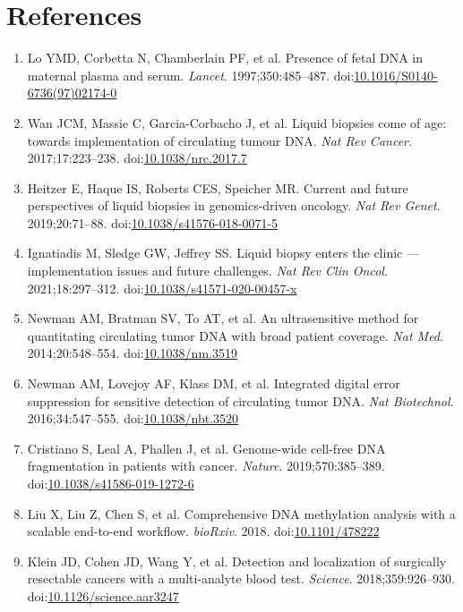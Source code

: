\documentclass[11pt]{article}
\begin{document}
\section{References}
\begin{enumerate}
\item
Lo YMD, Corbetta N, Chamberlain PF, et al. Presence of fetal DNA in maternal plasma and serum. \textit{Lancet}. 1997;350:485--487. doi:\href{https://doi.org/10.1016/S0140-6736(97)02174-0}{10.1016/\allowbreak{}S0140-6736(97)02174-0}
\item
Wan JCM, Massie C, Garcia-Corbacho J, et al. Liquid biopsies come of age: towards implementation of circulating tumour DNA. \textit{Nat Rev Cancer}. 2017;17:223--238. doi:\href{https://doi.org/10.1038/nrc.2017.7}{10.1038/\allowbreak{}nrc.2017.7}
\item
Heitzer E, Haque IS, Roberts CES, Speicher MR. Current and future perspectives of liquid biopsies in genomics-driven oncology. \textit{Nat Rev Genet}. 2019;20:71--88. doi:\href{https://doi.org/10.1038/s41576-018-0071-5}{10.1038/\allowbreak{}s41576-018-0071-5}
\item
Ignatiadis M, Sledge GW, Jeffrey SS. Liquid biopsy enters the clinic --- implementation issues and future challenges. \textit{Nat Rev Clin Oncol}. 2021;18:297--312. doi:\href{https://doi.org/10.1038/s41571-020-00457-x}{10.1038/\allowbreak{}s41571-020-00457-x}
\item
Newman AM, Bratman SV, To AT, et al. An ultrasensitive method for quantitating circulating tumor DNA with broad patient coverage. \textit{Nat Med}. 2014;20:548--554. doi:\href{https://doi.org/10.1038/nm.3519}{10.1038/\allowbreak{}nm.3519}
\item
Newman AM, Lovejoy AF, Klass DM, et al. Integrated digital error suppression for sensitive detection of circulating tumor DNA. \textit{Nat Biotechnol}. 2016;34:547--555. doi:\href{https://doi.org/10.1038/nbt.3520}{10.1038/\allowbreak{}nbt.3520}
\item
Cristiano S, Leal A, Phallen J, et al. Genome-wide cell-free DNA fragmentation in patients with cancer. \textit{Nature}. 2019;570:385--389. doi:\href{https://doi.org/10.1038/s41586-019-1272-6}{10.1038/\allowbreak{}s41586-019-1272-6}
\item
Liu X, Liu Z, Chen S, et al. Comprehensive DNA methylation analysis with a scalable end-to-end workflow. \textit{bioRxiv}. 2018. doi:\href{https://doi.org/10.1101/478222}{10.1101/\allowbreak{}478222}
\item
Klein JD, Cohen JD, Wang Y, et al. Detection and localization of surgically resectable cancers with a multi-analyte blood test. \textit{Science}. 2018;359:926--930. doi:\href{https://doi.org/10.1126/science.aar3247}{10.1126/\allowbreak{}science.aar3247}

\end{enumerate}
\end{document}
